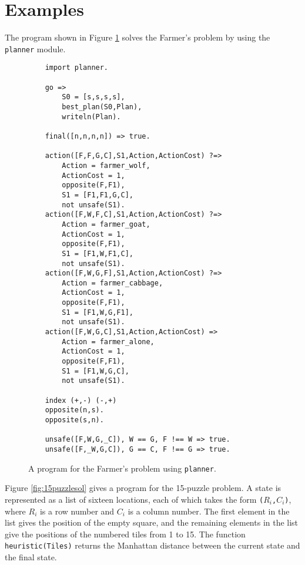 \section{Examples}
The program shown in Figure \ref{fig:farmer2} solves the Farmer's problem by using the \texttt{planner} module. 

\begin{figure}
\begin{center}
\begin{verbatim}
    import planner.

    go =>
        S0 = [s,s,s,s],
        best_plan(S0,Plan),
        writeln(Plan).

    final([n,n,n,n]) => true.

    action([F,F,G,C],S1,Action,ActionCost) ?=>
        Action = farmer_wolf,
        ActionCost = 1,        
        opposite(F,F1),
        S1 = [F1,F1,G,C],
        not unsafe(S1).
    action([F,W,F,C],S1,Action,ActionCost) ?=>
        Action = farmer_goat,
        ActionCost = 1,        
        opposite(F,F1),
        S1 = [F1,W,F1,C],
        not unsafe(S1).
    action([F,W,G,F],S1,Action,ActionCost) ?=>
        Action = farmer_cabbage,
        ActionCost = 1,        
        opposite(F,F1),
        S1 = [F1,W,G,F1],
        not unsafe(S1).
    action([F,W,G,C],S1,Action,ActionCost) =>
        Action = farmer_alone,
        ActionCost = 1,        
        opposite(F,F1),
        S1 = [F1,W,G,C],
        not unsafe(S1).

    index (+,-) (-,+)
    opposite(n,s).
    opposite(s,n).

    unsafe([F,W,G,_C]), W == G, F !== W => true.
    unsafe([F,_W,G,C]), G == C, F !== G => true.
\end{verbatim}
\end{center}
\caption{\label{fig:farmer2}A program for the Farmer's problem using \texttt{planner}.}
\end{figure}

Figure \ref{fig:15puzzlesol} gives a program for the 15-puzzle problem. A state is represented as a list of sixteen locations, each of which takes the form \texttt{($R_i$,$C_i$)}, where $R_i$ is a row number and $C_i$ is a column number. The first element in the list gives the position of the empty square, and the remaining elements in the list give the positions of the numbered tiles from 1 to 15. The function \texttt{heuristic(Tiles)} returns the Manhattan distance between the current state and the final state.


